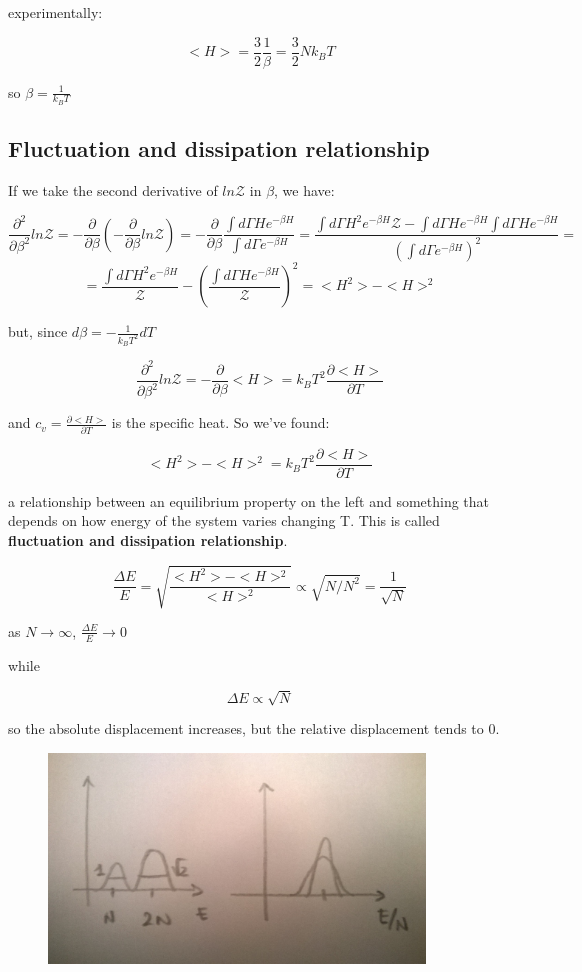 \documentclass[a4paper, italian, openany]{book}
\begin{document}
experimentally:

$$<H> = \frac{3}{2}\frac{1}{\beta} = \frac{3}{2} N k_B T$$

so $\beta = \frac{1}{k_B T}$


\subsection{Fluctuation and dissipation relationship}

If we take the second derivative of $ln\mathcal{Z}$ in $\beta$, we have:

$$\frac{\partial^2}{\partial \beta^2} ln \mathcal{Z} = - \frac{\partial}{\partial \beta} \left ( -\frac{\partial}{\partial \beta} ln\mathcal{Z} \right ) = -\frac{\partial}{\partial \beta} \frac{\int d\Gamma H e^{-\beta H}}{\int d\Gamma e^{-\beta H}} = \frac{\int d\Gamma H^2 e^{-\beta H} \mathcal{Z} - \int d\Gamma H e^{-\beta H} \int d\Gamma H e^{-\beta H}}{\left ( \int d\Gamma e^{-\beta H} \right )^2} =$$
$$= \frac{\int d\Gamma H^2 e^{-\beta H}}{\mathcal{Z}} - \left (\frac{ \int d\Gamma H e^{-\beta H}}{\mathcal{Z}}\right )^2 = <H^2> - <H>^2$$

but, since $d\beta = -\frac{1}{k_B T^2} dT$

$$\frac{\partial^2}{\partial \beta^2} ln \mathcal{Z} = -\frac{\partial}{\partial \beta} <H> = k_B T^2 \frac{\partial <H>}{\partial T}$$

and $c_v = \frac{\partial <H>}{\partial T}$ is the specific heat. So we've found:

$$<H^2> - <H>^2 = k_B T^2 \frac{\partial <H>}{\partial T}$$

a relationship between an equilibrium property on the left and something that depends on how energy of the system varies changing T. This is called \textbf{fluctuation and dissipation relationship}.

$$\frac{\Delta E}{E} = \sqrt{\frac{<H^2> -<H>^2}{<H>^2}} \propto \sqrt{N/N^2} = \frac{1}{\sqrt{N}}$$

as $N \to \infty$, $\frac{\Delta E}{E} \to 0$

while

$$\Delta E \propto \sqrt{N}$$

so the absolute displacement increases, but the relative displacement tends to 0.

\begin{figure}[H]
\centering
\includegraphics[width=100mm]{img/figure9.jpg}
\end{figure}
\end{document}

